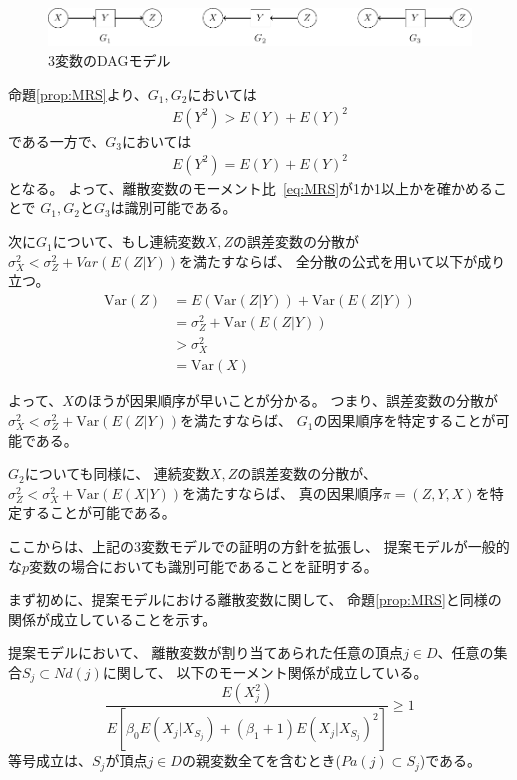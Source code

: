 \begin{figure}[ht]
  \centering
  \includegraphics{./picture/prop_three_variate.pdf}
  \caption{3変数のDAGモデル}
  \label{fig:prop_three_variate}
\end{figure}

命題\ref{prop:MRS}より、$G_1, G_2$においては
\begin{align*}
  E(Y^2) > E(Y) + E(Y)^2
\end{align*}
である一方で、$G_3$においては
\begin{align*}
  E(Y^2) = E(Y) + E(Y)^2
\end{align*}
となる。
よって、離散変数のモーメント比~\eqref{eq:MRS}が1か1以上かを確かめることで
$G_1, G_2$と$G_3$は識別可能である。

次に$G_1$について、もし連続変数$X, Z$の誤差変数の分散が
$\sigma_X^2 < \sigma_Z^2 + \mathit{Var}(E(Z|Y))$を満たすならば、
全分散の公式を用いて以下が成り立つ。
\begin{align*}
  \mathrm{Var}(Z) &= E(\mathrm{Var}(Z|Y)) + \mathrm{Var}(E(Z|Y)) \\
                  &= \sigma_Z^2 + \mathrm{Var}(E(Z|Y)) \\
                  &> \sigma_X^2 \\
                  &= \mathrm{Var}(X)
\end{align*}

よって、$X$のほうが因果順序が早いことが分かる。
つまり、誤差変数の分散が$\sigma_X^2 < \sigma_Z^2 + \mathrm{Var}(E(Z|Y))$を満たすならば、
$G_1$の因果順序を特定することが可能である。

$G_2$についても同様に、
連続変数$X, Z$の誤差変数の分散が、
$\sigma_Z^2 < \sigma_X^2 + \mathrm{Var}(E(X|Y))$を満たすならば、
真の因果順序$\pi = (Z, Y, X)$を特定することが可能である。


ここからは、上記の3変数モデルでの証明の方針を拡張し、
提案モデルが一般的な$p$変数の場合においても識別可能であることを証明する。

まず初めに、提案モデルにおける離散変数に関して、
命題\ref{prop:MRS}と同様の関係が成立していることを示す。

\begin{lemm}
  提案モデルにおいて、
  離散変数が割り当てあられた任意の頂点$j \in D$、任意の集合$S_j \subset Nd(j)$に関して、
  以下のモーメント関係が成立している。
  \begin{equation}
    \frac{E(X_j^2)}
    {E \left[ \beta_0 E(X_j | X_{S_j}) + (\beta_1 + 1)E(X_j | X_{S_j})^2 \right]}
    \geq 1
    \label{prop_MRS}
  \end{equation}
  等号成立は、$S_j$が頂点$j \in D$の親変数全てを含むとき($Pa(j) \subset S_j$)である。
  \label{lem_prop_MRS}
\end{lemm}

